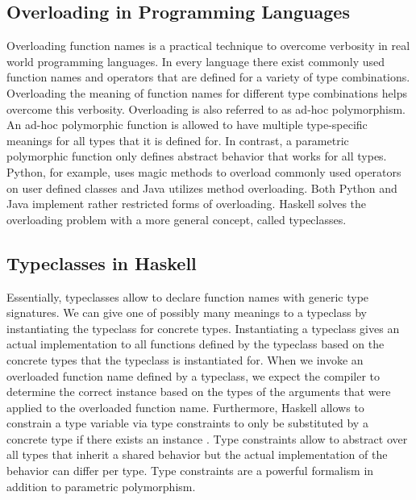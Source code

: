 \subsection{Overloading in Programming Languages}
Overloading function names is a practical technique to overcome verbosity in real world programming languages. 
In every language there exist commonly used function names and operators that are defined for a variety of type combinations.
Overloading the meaning of function names for different type combinations helps overcome this verbosity. Overloading is also referred to as ad-hoc polymorphism. An ad-hoc polymorphic function is allowed to have multiple type-specific meanings for all types that it is defined for. In contrast, a parametric polymorphic function only defines abstract behavior that works for all types.
Python, for example, uses magic methods to overload commonly used operators on user defined classes and Java utilizes method overloading. Both Python and Java implement rather restricted forms of overloading. Haskell solves the overloading problem with a more general concept, called typeclasses.

\subsection{Typeclasses in Haskell}
Essentially, typeclasses allow to declare function names with generic type signatures.
We can give one of possibly many meanings to a typeclass by instantiating the typeclass for concrete types. 
Instantiating a typeclass gives an actual implementation to all functions defined by the typeclass based on the concrete types that the typeclass is instantiated for.
When we invoke an overloaded function name defined by a typeclass, we expect the compiler to determine the correct instance based on the types of the arguments that were applied to the overloaded function name. 
Furthermore, Haskell allows to constrain a type variable  via type constraints  to only be substituted by a concrete type  if there exists an instance  . Type constraints allow to abstract over all types that inherit a shared behavior but the actual implementation of the behavior can differ per type. Type constraints are a powerful formalism in addition to parametric polymorphism.

